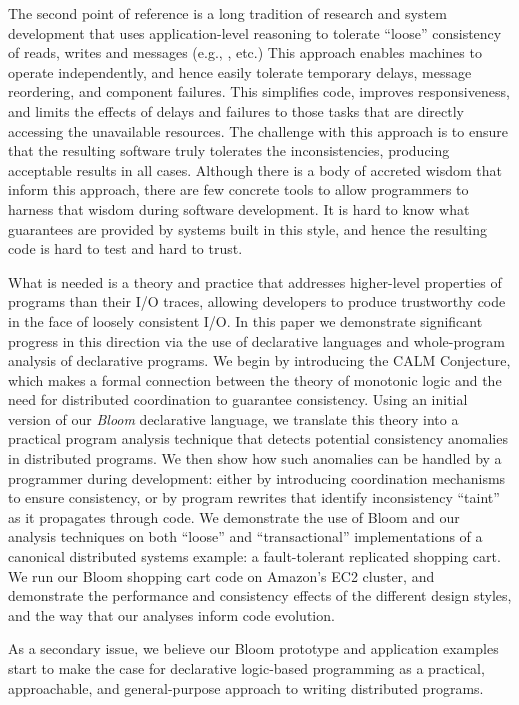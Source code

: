 The second point of reference is a long tradition of research and system development that uses application-level reasoning to tolerate ``loose'' consistency of reads, writes and messages (e.g., \cite{sagas,base,acid20}, etc.)  This approach enables machines to operate independently, and hence easily tolerate temporary delays, message reordering, and component failures.  This simplifies code, improves responsiveness, and limits the effects of delays and failures to those tasks that are directly accessing the unavailable resources.  The challenge with this approach is to ensure that the resulting software truly tolerates the inconsistencies, producing acceptable results in all cases.  Although there is a body of accreted wisdom that inform this approach, there are few concrete tools to allow programmers to harness that wisdom during software development.  It is hard to know what guarantees are provided by systems built in this style, and hence the resulting code is hard to test and hard to trust.  

What is needed is a theory and practice that addresses higher-level properties of programs than their I/O traces, allowing developers to produce trustworthy code in the face of loosely consistent I/O.  In this paper we demonstrate significant progress in this direction via the use of declarative languages and whole-program analysis of declarative programs.  We begin by introducing the CALM Conjecture, which makes a formal connection between the theory of monotonic logic and the need for distributed coordination to guarantee consistency.  Using an initial version of our {\em Bloom} declarative language, we translate this theory into a practical program analysis technique that detects potential consistency anomalies in distributed programs.  We then show how such anomalies can be handled by a programmer during development: either by introducing coordination mechanisms to ensure consistency, or by program rewrites that identify inconsistency ``taint'' as it propagates through code.  We demonstrate the use of Bloom and our analysis techniques on both ``loose'' and ``transactional'' implementations of a canonical distributed systems example: a fault-tolerant replicated shopping cart.  We run our Bloom shopping cart code on Amazon's EC2 cluster, and demonstrate the performance and consistency effects of the different design styles, and the way that our analyses inform code evolution.

As a secondary issue, we believe our Bloom prototype and application examples start to make the case for declarative logic-based programming as a practical, approachable, and general-purpose approach to writing distributed programs.
